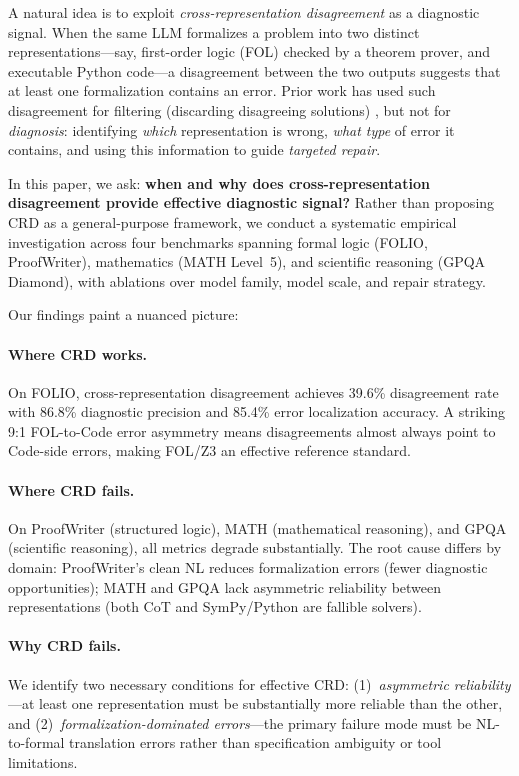 \documentclass[11pt,a4paper]{article}
\begin{document}
A natural idea is to exploit \textit{cross-representation disagreement} as a diagnostic signal. When the same LLM formalizes a problem into two distinct representations---say, first-order logic (FOL) checked by a theorem prover, and executable Python code---a disagreement between the two outputs suggests that at least one formalization contains an error. Prior work has used such disagreement for filtering (discarding disagreeing solutions) \cite{liang2024cot_pot}, but not for \textit{diagnosis}: identifying \textit{which} representation is wrong, \textit{what type} of error it contains, and using this information to guide \textit{targeted repair}.

In this paper, we ask: \textbf{when and why does cross-representation disagreement provide effective diagnostic signal?} Rather than proposing CRD as a general-purpose framework, we conduct a systematic empirical investigation across four benchmarks spanning formal logic (FOLIO, ProofWriter), mathematics (MATH Level~5), and scientific reasoning (GPQA Diamond), with ablations over model family, model scale, and repair strategy.

Our findings paint a nuanced picture:

\paragraph{Where CRD works.} On FOLIO, cross-representation disagreement achieves 39.6\% disagreement rate with 86.8\% diagnostic precision and 85.4\% error localization accuracy. A striking 9:1 FOL-to-Code error asymmetry means disagreements almost always point to Code-side errors, making FOL/Z3 an effective reference standard.

\paragraph{Where CRD fails.} On ProofWriter (structured logic), MATH (mathematical reasoning), and GPQA (scientific reasoning), all metrics degrade substantially. The root cause differs by domain: ProofWriter's clean NL reduces formalization errors (fewer diagnostic opportunities); MATH and GPQA lack asymmetric reliability between representations (both CoT and SymPy/Python are fallible solvers).

\paragraph{Why CRD fails.} We identify two necessary conditions for effective CRD: (1)~\textit{asymmetric reliability}---at least one representation must be substantially more reliable than the other, and (2)~\textit{formalization-dominated errors}---the primary failure mode must be NL-to-formal translation errors rather than specification ambiguity or tool limitations.
\end{document}
